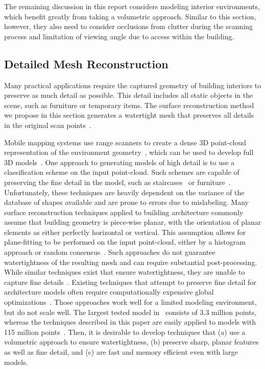 \documentclass[journal]{IEEEtran}
\begin{document}
The remaining discussion in this report considers modeling interior environments, which benefit greatly from taking a volumetric approach.  Similar to this section, however, they also need to consider occlusions from clutter during the scanning process and limitation of viewing angle due to access within the building.

\subsection{Detailed Mesh Reconstruction}
\label{ssec:carving}

Many practical applications require the captured geometry of building interiors to preserve as much detail as possible. This detail includes all static objects in the scene, such as furniture or temporary items.  The surface reconstruction method we propose in this section generates a watertight mesh that preserves all details in the original scan points~\cite{Turner13}.

Mobile mapping systems use range scanners to create a dense 3D point-cloud representation of the environment geometry~\cite{Sweep,Localization}, which can be used to develop full 3D models~\cite{Pons10,Carving}.  One approach to generating models of high detail is to use a classification scheme on the input point-cloud.  Such schemes are capable of preserving the fine detail in the model, such as staircases~\cite{Victors} or furniture~\cite{Kim12, SearchClassifyPointcloud, Shao12}.  Unfortunately, these techniques are heavily dependent on the variance of the database of shapes available and are prone to errors due to mislabeling.  Many surface reconstruction techniques applied to building architecture commonly assume that building geometry is piece-wise planar, with the orientation of planar elements as either perfectly horizontal or vertical.  This assumption allows for plane-fitting to be performed on the input point-cloud, either by a histogram approach or random consensus~\cite{HistWallRecon,Victors,BasicPlaneFit}.  Such approaches do not guarantee watertightness of the resulting mesh and can require substantial post-processing.  While similar techniques exist that ensure watertightness, they are unable to capture fine details~\cite{Museums}. Existing techniques that attempt to preserve fine detail for architecture models often require computationally expensive global optimizations~\cite{Pons10}.  Those approaches work well for a limited modeling environment, but do not scale well.  The largest tested model in~\cite{Pons10} consists of 3.3 million points, whereas the techniques described in this paper are easily applied to models with 115 million points~\cite{Turner13}.  Then, it is desirable to develop techniques that (a) use a volumetric approach to ensure watertightness, (b) preserve sharp, planar features as well as fine detail, and (c) are fast and memory efficient even with large models.
\end{document}
